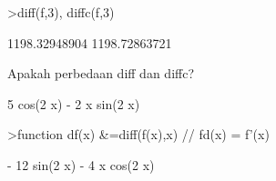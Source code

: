 \documentclass[a4paper,10pt]{article}
\begin{document}
\begin{eulernotebook}
\begin{eulercomment}
\begin{eulercomment}
\begin{eulercomment}
\begin{eulercomment}
\begin{euleroutput}
\end{euleroutput}
\begin{eulerprompt}
>diff(f,3), diffc(f,3)
\end{eulerprompt}
\begin{euleroutput}
  1198.32948904
  1198.72863721
\end{euleroutput}
\begin{eulercomment}
Apakah perbedaan diff dan diffc?
\end{eulercomment}
\begin{euleroutput}
  
                        5 cos(2 x) - 2 x sin(2 x)
  
\end{euleroutput}
\begin{eulerprompt}
>function df(x) &=diff(f(x),x) // fd(x) = f'(x)
\end{eulerprompt}
\begin{euleroutput}
  
                       - 12 sin(2 x) - 4 x cos(2 x)
  

\end{euleroutput}
\end{eulercomment}
\end{eulercomment}
\end{eulercomment}
\end{eulercomment}
\end{eulernotebook}
\end{document}
